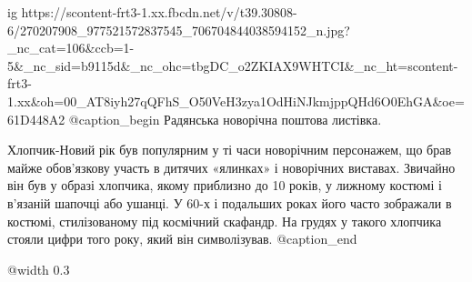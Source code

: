  
 
 
 
 

\ifcmt
  ig https://scontent-frt3-1.xx.fbcdn.net/v/t39.30808-6/270207908_977521572837545_706704844038594152_n.jpg?_nc_cat=106&ccb=1-5&_nc_sid=b9115d&_nc_ohc=tbgDC_o2ZKIAX9WHTCI&_nc_ht=scontent-frt3-1.xx&oh=00_AT8iyh27qQFhS_O50VeH3zya1OdHiNJkmjppQHd6O0EhGA&oe=61D448A2
  @caption_begin
    Радянська новорічна поштова листівка.

    Хлопчик-Новий рік був популярним у ті часи новорічним персонажем, що брав майже
    обов’язкову участь в дитячих «ялинках» і новорічних виставах. Звичайно він був
    у образі хлопчика, якому приблизно до 10 років, у лижному костюмі і в’язаній
    шапочці або ушанці. У 60-х і подальших роках його часто зображали в костюмі,
    стилізованому під космічний скафандр. На грудях у такого хлопчика стояли цифри
    того року, який він символізував.
  @caption_end

  @width 0.3
\fi
